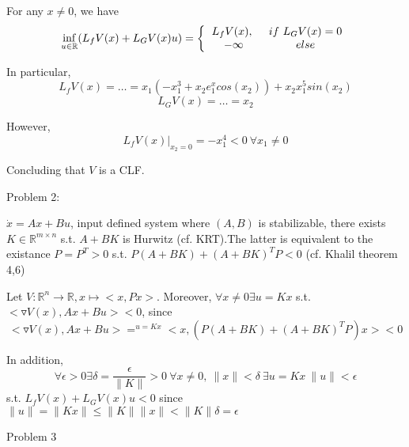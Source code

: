 For any $x \neq 0$, we have 
\begin{equation*}
\inf_{u \in \mathbb{R}}(L_fV(x) + L_GV(x)u) = 
\left \{ 
\begin{tabular}{cc} 
$L_fV(x), \ $ & $if\ L_GV(x) = 0$ \\ 
$- \infty$ & $else$ 
\end{tabular} 
\right.
\end{equation*}

In particular,
\begin{equation*}
L_fV(x) = \dots = x_1(-x_1^3 + x_2e^x_1 cos(x_2)) + x_2x_1^5sin(x_2)
\end{equation*}
\begin{equation*}
L_GV(x) = \dots = x_2
\end{equation*}

However, 
\begin{equation*}
L_fV(x)|_{x_2 = 0} = -x_1^4 < 0 \ \forall x_1 \neq 0
\end{equation*}

Concluding that $V$ is a CLF.

Problem 2:

$\dot{x} = Ax + Bu$, input defined system where $(A,B)$ is stabilizable, there exists $K \in \mathbb{R}^{m \times n}$ s.t. $A+BK$ is Hurwitz (cf. KRT).The latter is equivalent to the existance $P = P^T > 0$ s.t. $P(A+BK) + (A+BK)^TP < 0$ (cf. Khalil theorem 4,6)

Let $V: \mathbb{R}^n \to \mathbb{R}, x \mapsto <x, Px>$. Moreover, $\forall x \neq 0 \exists u = Kx$ s.t. $<\triangledown V(x), Ax+Bu> < 0$, since 
\begin{equation*}
<\triangledown V(x), Ax+Bu> =^{u = Kx} <x, (P(A+BK)+ (A+BK)^TP)x> < 0
\end{equation*} 

In addition,
\begin{equation*}
\forall \epsilon > 0 \exists \delta = \frac{\epsilon}{\|K\| } > 0 \ \forall x \neq 0, \ \|x\| < \delta \ \exists u = Kx \ \|u\| < \epsilon 
\end{equation*}
s.t. $L_fV(x) + L_GV(x)u < 0$ since $\|u\| = \|Kx\| \leq \|K\|\|x\| < \|K\|\delta = \epsilon$

Problem 3

